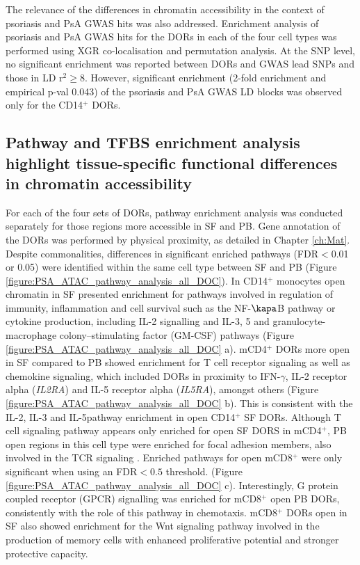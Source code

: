 The relevance of the differences in chromatin accessibility in the context of psoriasis and PsA GWAS hits was also addressed. Enrichment analysis of psoriasis and PsA GWAS hits for the DORs in each of the four cell types was performed using XGR co-localisation and permutation analysis. At the SNP level, no significant enrichment was reported  between DORs and GWAS lead SNPs and those in LD r$^2$$\geq$8. However, significant enrichment (2-fold enrichment and empirical p-val 0.043) of the psoriasis and PsA GWAS LD blocks was observed only for the CD14$^+$ DORs.
%
%

\subsection{Pathway and TFBS enrichment analysis highlight tissue-specific functional differences in chromatin accessibility}

For each of the four sets of DORs, pathway enrichment analysis was conducted separately for those regions more accessible in SF and PB. Gene annotation of the DORs was performed by physical proximity, as detailed in Chapter \ref{ch:Mat}. Despite commonalities, differences in significant enriched pathways (FDR$<$0.01 or 0.05) were identified within the same cell type between SF and PB (Figure \ref{figure:PSA_ATAC_pathway_analysis_all_DOC}). In CD14$^+$ monocytes open chromatin in SF presented enrichment for pathways involved in regulation of immunity, inflammation and cell survival such as the NF-$\kapa$B pathway or cytokine production, including IL-2 signalling and IL-3, 5 and granulocyte-macrophage colony–stimulating factor (GM-CSF) pathways (Figure \ref{figure:PSA_ATAC_pathway_analysis_all_DOC} a). mCD4$^+$ DORs more open in SF compared to PB showed enrichment for T cell receptor signaling as well as chemokine signaling, which included DORs in proximity to IFN-$\gamma$, IL-2 receptor alpha (\textit{IL2RA}) and IL-5 receptor alpha (\textit{IL5RA}), amongst others (Figure \ref{figure:PSA_ATAC_pathway_analysis_all_DOC} b). This is consistent with the IL-2, IL-3 and IL-5pathway enrichment in open CD14$^+$ SF DORs. Although T cell signaling pathway appears only enriched for open SF DORS in mCD4$^+$, PB open regions in this cell type were enriched for focal adhesion members, also involved in the TCR signaling \parencite{XY}. Enriched pathways for open mCD8$^+$ were only significant when using an FDR$<0.5$ threshold. (Figure \ref{figure:PSA_ATAC_pathway_analysis_all_DOC} c). Interestingly, G protein coupled receptor (GPCR) signalling was enriched for mCD8$^+$ open PB DORs, consistently with the role of this pathway in chemotaxis. mCD8$^+$ DORs open in SF also showed enrichment for the Wnt signaling pathway involved in the production of memory cells with enhanced proliferative potential and stronger protective capacity. 


